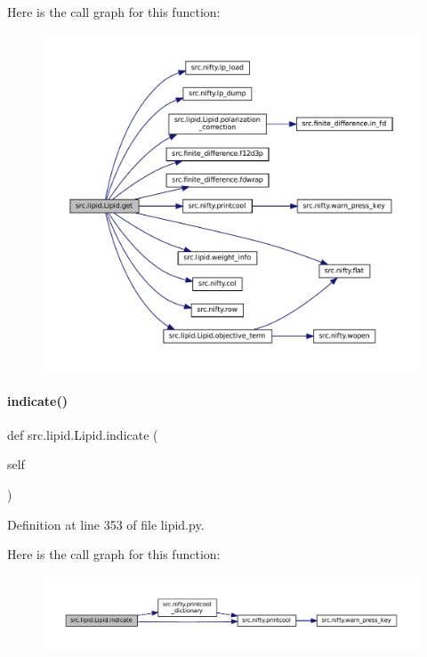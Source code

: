 Here is the call graph for this function\+:
\nopagebreak
\begin{figure}[H]
\begin{center}
\leavevmode
\includegraphics[width=350pt]{classsrc_1_1lipid_1_1Lipid_abee27b196cebb83890d15359ef80e1e6_cgraph}
\end{center}
\end{figure}
\mbox{\label{classsrc_1_1lipid_1_1Lipid_a1568b7a3ac5e2bbc5b0893feb174e9bd}} 
\paragraph{\texorpdfstring{indicate()}{indicate()}}
{\footnotesize\ttfamily def src.\+lipid.\+Lipid.\+indicate (\begin{DoxyParamCaption}\item[{}]{self }\end{DoxyParamCaption})}



Definition at line 353 of file lipid.\+py.

Here is the call graph for this function\+:
\nopagebreak
\begin{figure}[H]
\begin{center}
\leavevmode
\includegraphics[width=350pt]{classsrc_1_1lipid_1_1Lipid_a1568b7a3ac5e2bbc5b0893feb174e9bd_cgraph}
\end{center}
\end{figure}
\mbox{\label{classsrc_1_1lipid_1_1Lipid_acc748653a328afae3ab3c61d7e69314d}} 
